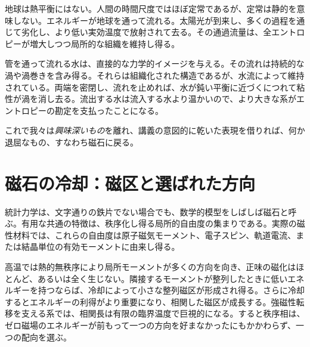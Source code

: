 地球は熱平衡にはない。人間の時間尺度ではほぼ定常であるが、定常は静的を意味しない。エネルギーが地球を通って流れる。太陽光が到来し、多くの過程を通じて劣化し、より低い実効温度で放射されて去る。その通過流量は、全エントロピーが増大しつつ局所的な組織を維持し得る。

管を通って流れる水は、直接的な力学的イメージを与える。その流れは持続的な渦や渦巻きを含み得る。それらは組織化された構造であるが、水流によって維持されている。両端を密閉し、流れを止めれば、水が鈍い平衡に近づくにつれて粘性が渦を消し去る。流出する水は流入する水より温かいので、より大きな系がエントロピーの勘定を支払ったことになる。

\begin{classroomqa}
\end{classroomqa}

これで我々は\emph{興味深いもの}を離れ、講義の意図的に乾いた表現を借りれば、何か退屈なもの、すなわち磁石に戻る。

\section{磁石の冷却：磁区と選ばれた方向}

統計力学は、文字通りの鉄片でない場合でも、数学的模型をしばしば磁石と呼ぶ。有用な共通の特徴は、秩序化し得る局所的自由度の集まりである。実際の磁性材料では、これらの自由度は原子磁気モーメント、電子スピン、軌道電流、または結晶単位の有効モーメントに由来し得る。

高温では熱的無秩序により局所モーメントが多くの方向を向き、正味の磁化はほとんど、あるいは全く生じない。隣接するモーメントが整列したときに低いエネルギーを持つならば、冷却によって小さな整列磁区が形成され得る。さらに冷却するとエネルギーの利得がより重要になり、相関した磁区が成長する。強磁性転移を支える系では、相関長は有限の臨界温度で巨視的になる。すると秩序相は、ゼロ磁場のエネルギーが前もって一つの方向を好まなかったにもかかわらず、一つの配向を選ぶ。

\begin{classroomqa}
\end{classroomqa}

